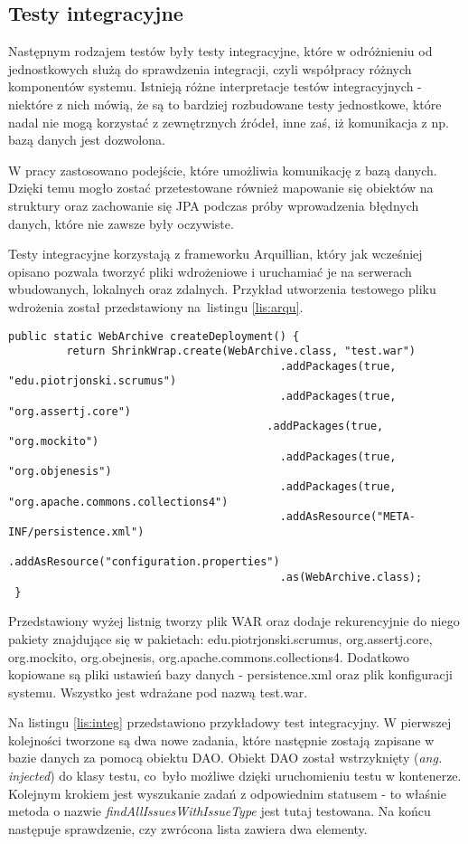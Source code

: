 \subsection{Testy integracyjne}
Następnym rodzajem testów były testy integracyjne, które w odróżnieniu od jednostkowych służą do sprawdzenia integracji, czyli współpracy różnych komponentów systemu. Istnieją różne interpretacje testów integracyjnych - niektóre z nich mówią, że są to bardziej rozbudowane testy jednostkowe, które nadal nie mogą korzystać z zewnętrznych źródeł, inne zaś, iż komunikacja z np. bazą danych jest dozwolona. 

W pracy zastosowano podejście, które umożliwia komunikację z bazą danych. Dzięki temu mogło zostać przetestowane również mapowanie się obiektów na struktury oraz zachowanie się JPA podczas próby wprowadzenia błędnych danych, które nie zawsze były oczywiste.

Testy integracyjne korzystają z frameworku Arquillian, który jak wcześniej opisano pozwala tworzyć pliki wdrożeniowe i uruchamiać je na serwerach wbudowanych, lokalnych oraz zdalnych. Przykład utworzenia testowego pliku wdrożenia został przedstawiony na~listingu \ref{lis:arqu}.

\begin{lstlisting}[caption={Przykład przygotowania pliku wdrożenia Arquillian}, label=lis:arqu, numbers=none]
 public static WebArchive createDeployment() {
		 return ShrinkWrap.create(WebArchive.class, "test.war")
										  .addPackages(true, "edu.piotrjonski.scrumus")
										  .addPackages(true, "org.assertj.core")
									   	.addPackages(true, "org.mockito")
										  .addPackages(true, "org.objenesis")
										  .addPackages(true, "org.apache.commons.collections4")
										  .addAsResource("META-INF/persistence.xml")
										  .addAsResource("configuration.properties")
										  .as(WebArchive.class);
 }\end{lstlisting}

Przedstawiony wyżej listnig tworzy plik WAR oraz dodaje rekurencyjnie do niego pakiety znajdujące się w pakietach: edu.piotrjonski.scrumus, org.assertj.core, org.mockito, org.obejnesis, org.apache.commons.collections4. Dodatkowo kopiowane są pliki ustawień bazy danych - persistence.xml oraz plik konfiguracji systemu. Wszystko jest wdrażane pod nazwą test.war.

Na listingu \ref{lis:integ} przedstawiono przykładowy test integracyjny. W pierwszej kolejności tworzone są dwa nowe zadania, które następnie zostają zapisane w bazie danych za pomocą obiektu DAO. Obiekt DAO został wstrzyknięty (\textit{ang. injected}) do klasy testu, co~było możliwe dzięki uruchomieniu testu w kontenerze. Kolejnym krokiem jest wyszukanie zadań z odpowiednim statusem - to właśnie metoda o nazwie \textit{findAllIssuesWithIssueType} jest tutaj testowana. Na końcu następuje sprawdzenie, czy zwrócona lista zawiera dwa elementy.

